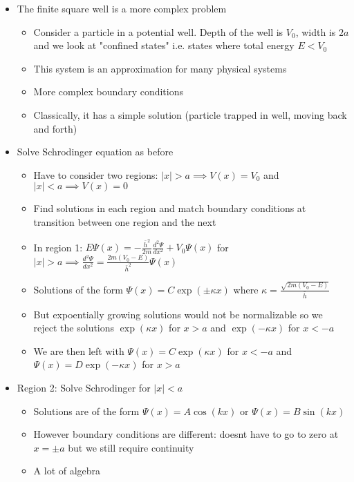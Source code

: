 \documentclass[12pt]{article}
\begin{document}
\begin{itemize}
    \item The finite square well is a more complex problem \begin{itemize}
        \item Consider a particle in a potential well. Depth of the well is $V_0$, width is $2a$ and we look at "confined states" i.e. states where total energy $E < V_0$
        \item This system is an approximation for many physical systems
        \item More complex boundary conditions
        \item Classically, it has a simple solution (particle trapped in well, moving back and forth)
    \end{itemize}
    \item Solve Schrodinger equation as before \begin{itemize}
        \item Have to consider two regions: $|x| > a \implies V(x) = V_0$ and $|x| < a \implies V(x) = 0$
        \item Find solutions in each region and match boundary conditions at transition between one region and the next
        \item In region 1: $E \varPsi(x) = - \frac{\bar{h}^2}{2m} \frac{d^2 \varPsi}{dx^2} + V_0 \varPsi(x)$ for $|x| > a \implies \frac{d^2 \varPsi}{dx^2} = \frac{2m(V_0-E)}{\bar{h}^2} \varPsi(x)$
        \item Solutions of the form $\varPsi(x) = C \exp (\pm \kappa x)$ where $\kappa = \frac{\sqrt{2m(V_0 - E)}}{\bar{h}}$
        \item But expoentially growing solutions would not be normalizable so we reject the solutions $\exp(\kappa x)$ for $x > a$ and $\exp(- \kappa x)$ for $x < -a$
        \item We are then left with $\varPsi(x) = C \exp(\kappa x)$ for $x < -a$ and $\varPsi(x) = D \exp (- \kappa x)$ for $x > a$
    \end{itemize}
    \item Region 2: Solve Schrodinger for $|x| < a$ \begin{itemize}
        \item Solutions are of the form $\varPsi(x) = A \cos(kx)$ or $\varPsi(x) = B \sin(kx)$
        \item However boundary conditions are different: doesnt have to go to zero at $x = \pm a$ but we still require continuity
        \item A lot of algebra
    \end{itemize}
\end{itemize}
\end{document}
